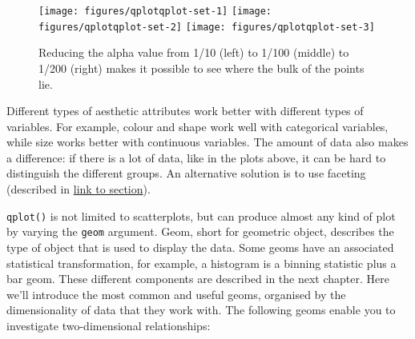 \begin{Shaded}
\begin{Highlighting}[]
  \NormalTok{(}\NormalTok{/}\NormalTok{))}
  \NormalTok{(}\NormalTok{/}\NormalTok{))}
  \NormalTok{(}\NormalTok{/}\NormalTok{))}
\end{Highlighting}
\end{Shaded}

\begin{figure}

{\centering \texttt{[image: figures/qplotqplot-set-1]} \texttt{[image: figures/qplotqplot-set-2]} \texttt{[image: figures/qplotqplot-set-3]} 

}

\caption{Reducing the alpha value from 1/10 (left) to 1/100 (middle) to 1/200 (right) makes it possible to see where the bulk of the points lie.\label{fig:qplot-set}}
\end{figure}

Different types of aesthetic attributes work better with different types
of variables. For example, colour and shape work well with categorical
variables, while size works better with continuous variables. The amount
of data also makes a difference: if there is a lot of data, like in the
plots above, it can be hard to distinguish the different groups. An
alternative solution is to use faceting (described in
\hyperref[sec:qplot-faceting]{link to section}).


\texttt{qplot()} is not limited to scatterplots, but can produce almost
any kind of plot by varying the \texttt{geom} argument. Geom, short for
geometric object, describes the type of object that is used to display
the data. Some geoms have an associated statistical transformation, for
example, a histogram is a binning statistic plus a bar geom. These
different components are described in the next chapter. Here we'll
introduce the most common and useful geoms, organised by the
dimensionality of data that they work with. The following geoms enable
you to investigate two-dimensional relationships:

